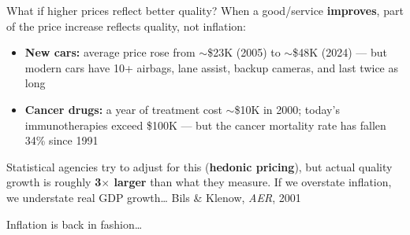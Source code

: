 \documentclass[aspectratio=169]{beamer}
\begin{document}
\begin{frame}[t]{What if higher prices reflect better quality?}
   \small
   When a good/service \textbf{improves}, part of the price increase reflects quality, not inflation:
   \vspace{0.15cm}
   \begin{itemize}
      \setlength\itemsep{0.15cm}
      \item \textbf{New cars:} average price rose from $\sim$\$23K (2005) to $\sim$\$48K (2024) --- but modern cars have 10+ airbags, lane assist, backup cameras, and last twice as long
      \item \textbf{Cancer drugs:} a year of treatment cost $\sim$\$10K in 2000; today's immunotherapies exceed \$100K --- but the cancer mortality rate has fallen 34\% since 1991
   \end{itemize}
   \vspace{0.1cm}
   \begin{keyinsight}
      Statistical agencies try to adjust for this (\textbf{hedonic pricing}), but actual quality growth is roughly \textbf{3$\times$ larger} than what they measure. If we overstate inflation, we understate real GDP growth\ldots
      \hfill{\scriptsize\textcolor{HECgray}{Bils \& Klenow, \textit{AER}, 2001}}
   \end{keyinsight}
\end{frame}

\begin{frame}{Inflation is back in fashion\ldots}
\end{frame}
\end{document}
